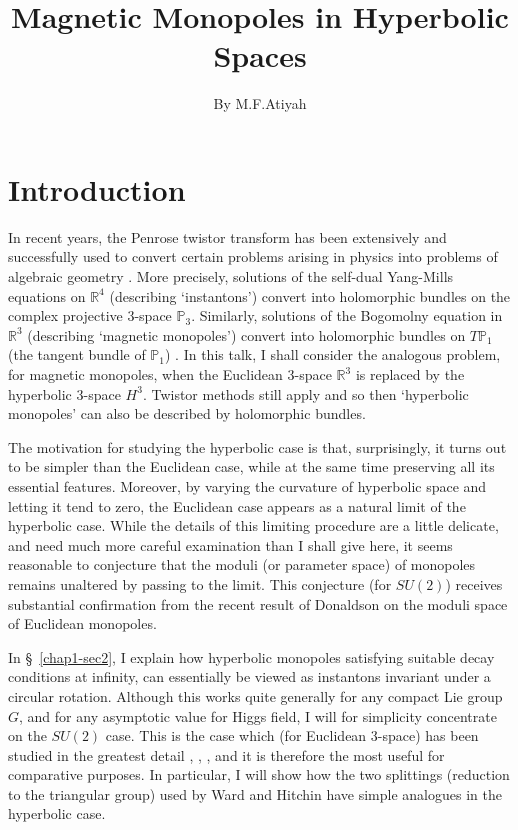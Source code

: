 \title{Magnetic Monopoles in Hyperbolic Spaces}\label{chap1}

\author{By M.F.\@ Atiyah}

\date{}
\maketitle


\section{Introduction}\label{chap1-sec1}\pageoriginale

In recent years, the Penrose twistor transform has been extensively
and successfully used to convert certain problems arising in physics
into problems of algebraic geometry \cite{chap1-key1}. More precisely,
solutions of the self-dual Yang-Mills equations on $\mathbb{R}^{4}$
(describing `instantons') convert into holomorphic bundles on the
complex projective 3-space $\mathbb{P}_{3}$. Similarly, solutions of
the Bogomolny equation in $\mathbb{R}^{3}$ (describing `magnetic
monopoles') convert into holomorphic bundles on $T\mathbb{P}_{1}$ (the
tangent bundle of $\mathbb{P}_{1}$) \cite{chap1-key7}. In this talk, I
shall consider the analogous problem, for magnetic monopoles, when the
Euclidean 3-space $\mathbb{R}^{3}$ is replaced by the hyperbolic
3-space $H^{3}$. Twistor methods still apply and so then `hyperbolic
monopoles' can also be described by holomorphic bundles. 

The motivation for studying the hyperbolic case is that, surprisingly,
it turns out to be simpler than the Euclidean case, while at the same
time preserving all its essential features. Moreover, by varying the
curvature of hyperbolic space and letting it tend to zero, the
Euclidean case appears as a natural limit of the hyperbolic
case. While the details of this limiting procedure are a little
delicate, and need much more careful examination than I shall give
here, it seems reasonable to conjecture that the moduli (or parameter
space) of monopoles remains unaltered by passing to the limit. This
conjecture (for $SU(2)$) receives substantial confirmation from the
recent result of Donaldson \cite{chap1-key5} on the moduli space of
Euclidean monopoles.

In \S\ \ref{chap1-sec2}, I explain how hyperbolic monopoles satisfying
suitable decay conditions at infinity, can essentially be viewed as
instantons invariant under a circular rotation. Although this works
quite generally for any compact Lie group $G$, and for any asymptotic
value for Higgs field, I will for simplicity concentrate\pageoriginale
on the $SU(2)$ case. This is the case which (for Euclidean 3-space)
has been studied in the greatest detail \cite{chap1-key7},
\cite{chap1-key8}, \cite{chap1-key9}, \cite{chap1-key10} and it is
therefore the most useful for comparative purposes. In particular, I
will show how the two splittings (reduction to the triangular group)
used by Ward \cite{chap1-key10} and Hitchin \cite{chap1-key7} have
simple analogues in the hyperbolic case.


